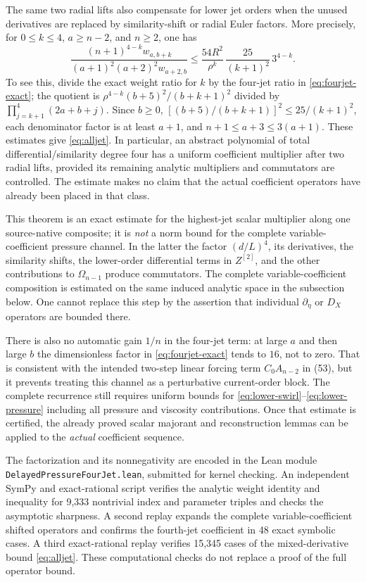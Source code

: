 The same two radial lifts also compensate for lower jet orders
when the unused derivatives are replaced by similarity-shift or radial
Euler factors. More precisely, for $0\le k\le4$, $a\ge n-2$, and
$n\ge2$, one has
\begin{equation}\label{eq:alljet}
 \frac{(n+1)^{4-k}w_{a,b+k}}
 {(a+1)^2(a+2)^2w_{a+2,b}}
 \le \frac{54R^2}{\rho^k}\,
 \frac{25}{(k+1)^2}\,3^{4-k}.
\end{equation}
To see this, divide the exact weight ratio for $k$ by the
four-jet ratio in \eqref{eq:fourjet-exact}; the quotient is
$\rho^{4-k}(b+5)^2/(b+k+1)^2$ divided by
$\prod_{j=k+1}^4(2a+b+j)$. Since $b\ge0$,
$[(b+5)/(b+k+1)]^2\le25/(k+1)^2$, each denominator
factor is at least $a+1$, and $n+1\le a+3\le3(a+1)$.
These estimates give \eqref{eq:alljet}. In particular, an
abstract polynomial of total differential/similarity degree four
has a uniform coefficient multiplier after two radial lifts,
provided its remaining analytic multipliers and commutators are
controlled. The estimate makes no claim that the actual
coefficient operators have already been placed in that class.

This theorem is an exact estimate for the highest-jet scalar
multiplier along one source-native composite; it is \emph{not}
a norm bound for the complete variable-coefficient pressure
channel. In the latter the factor $(d/L)^4$, its derivatives,
the similarity shifts, the lower-order differential terms in
$Z^{[2]}$, and the other contributions to $\Omega_{n-1}$
produce commutators. The complete variable-coefficient composition is estimated
on the same induced analytic space in the subsection below. One cannot replace this step by the
assertion that individual $\partial_\eta$ or $D_X$ operators
are bounded there.

There is also no automatic gain $1/n$ in the four-jet
term: at large $a$ and then large $b$ the dimensionless
factor in \eqref{eq:fourjet-exact} tends to $16$, not to zero.
That is consistent with the intended two-step linear forcing
term $C_0A_{n-2}$ in (53), but it prevents treating this
channel as a perturbative current-order block. The complete
recurrence still requires uniform bounds for
\eqref{eq:lower-swirl}--\eqref{eq:lower-pressure} including
all pressure and viscosity contributions. Once that estimate
is certified, the already proved scalar majorant and
reconstruction lemmas can be applied to the \emph{actual}
coefficient sequence.

The factorization and its nonnegativity are encoded in the
Lean module \texttt{DelayedPressure}\allowbreak\texttt{FourJet.lean}, submitted
for kernel checking. An independent SymPy and exact-rational
script verifies the analytic weight identity and inequality
for 9,333 nontrivial index and parameter triples and checks
the asymptotic sharpness. A second replay expands the complete
variable-coefficient shifted operators and confirms the fourth-jet
coefficient in 48 exact symbolic cases. A third exact-rational
replay verifies 15,345 cases of the mixed-derivative bound
\eqref{eq:alljet}. These computational checks do not
replace a proof of the full operator bound.


